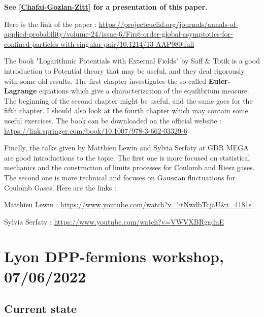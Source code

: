 \documentclass[a4paper,12pt]{report}
\begin{document}
\textbf{See \ref{Chafai-Gozlan-Zitt} for a presentation of this paper.}

Here is the link of the paper : \href{https://projecteuclid.org/journals/annals-of-applied-probability/volume-24/issue-6/First-order-global-asymptotics-for-confined-particles-with-singular-pair/10.1214/13-AAP980.full}{https://projecteuclid.org/journals/annals-of-applied-probability/volume-24/issue-6/First-order-global-asymptotics-for-confined-particles-with-singular-pair/10.1214/13-AAP980.full}
\vspace{0.5cm}

The book "Logarithmic Potentials with External Fields" by Saff \& Totik \cite{saff-totik} is a good introduction to Potential theory that may be useful, and they deal rigorously with some old results. The first chapter investigates the so-called \textbf{Euler-Lagrange} equations which give a characterization of the equilibrium measure. The beginning of the second chapter might be useful, and the same goes for the fifth chapter. I should also look at the fourth chapter which may contain some useful exercices. The book can be downloaded on the official website : \href{https://link.springer.com/book/10.1007/978-3-662-03329-6}{https://link.springer.com/book/10.1007/978-3-662-03329-6}
\vspace{0.5cm}


Finally, the talks given by Matthieu Lewin and Sylvia Serfaty at GDR MEGA are good introductions to the topic. The first one is more focused on statistical mechanics and the construction of limits processes for Coulomb and Riesz gases. The second one is more technical and focuses on Gaussian fluctuations for Coulomb Gases. Here are the links : 

Matthieu Lewin : \href{https://www.youtube.com/watch?v=htNwdbTcjaU\&t=4181s}{https://www.youtube.com/watch?v=htNwdbTcjaU\&t=4181s}

Sylvia Serfaty : \href{https://www.youtube.com/watch?v=VWVXBRggdnE}{https://www.youtube.com/watch?v=VWVXBRggdnE}




\section{Lyon DPP-fermions workshop, 07/06/2022}\label{meet:0706}

\subsection*{Current state}
\end{document}
